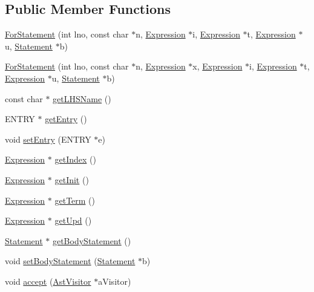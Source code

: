 \subsection*{Public Member Functions}
\begin{DoxyCompactItemize}
\item 
\hyperlink{classForStatement_a34f22456bd665a1d358716e7e71a2eb1}{ForStatement} (int lno, const char $\ast$n, \hyperlink{classExpression}{Expression} $\ast$i, \hyperlink{classExpression}{Expression} $\ast$t, \hyperlink{classExpression}{Expression} $\ast$u, \hyperlink{classStatement}{Statement} $\ast$b)
\item 
\hyperlink{classForStatement_a203c223b6af97279d479734239c76604}{ForStatement} (int lno, const char $\ast$n, \hyperlink{classExpression}{Expression} $\ast$x, \hyperlink{classExpression}{Expression} $\ast$i, \hyperlink{classExpression}{Expression} $\ast$t, \hyperlink{classExpression}{Expression} $\ast$u, \hyperlink{classStatement}{Statement} $\ast$b)
\item 
const char $\ast$ \hyperlink{classForStatement_a15ffa4871bab8d925468d7171e621562}{getLHSName} ()
\item 
ENTRY $\ast$ \hyperlink{classForStatement_a42b0ef907ad4181b001392c7cb496cdf}{getEntry} ()
\item 
void \hyperlink{classForStatement_a1634064d332150b7a62ac40813776f84}{setEntry} (ENTRY $\ast$e)
\item 
\hyperlink{classExpression}{Expression} $\ast$ \hyperlink{classForStatement_a69d2324b4aa27a7bb286e5dfcbebe2bf}{getIndex} ()
\item 
\hyperlink{classExpression}{Expression} $\ast$ \hyperlink{classForStatement_a114c3ab74b627e7dcf33868864596d97}{getInit} ()
\item 
\hyperlink{classExpression}{Expression} $\ast$ \hyperlink{classForStatement_a7ecbeae3c4766ceb9510e02740284467}{getTerm} ()
\item 
\hyperlink{classExpression}{Expression} $\ast$ \hyperlink{classForStatement_a81f61002e628cff42005f4dce5c477f2}{getUpd} ()
\item 
\hyperlink{classStatement}{Statement} $\ast$ \hyperlink{classForStatement_ae52531005fd0fd8cb5e19bba89679548}{getBodyStatement} ()
\item 
void \hyperlink{classForStatement_af81e95d20aa9fe2e84cf1611845653bb}{setBodyStatement} (\hyperlink{classStatement}{Statement} $\ast$b)
\item 
void \hyperlink{classForStatement_a8d31a952806bc123a2f6227d4aa17f2f}{accept} (\hyperlink{classAstVisitor}{AstVisitor} $\ast$aVisitor)
\end{DoxyCompactItemize}


